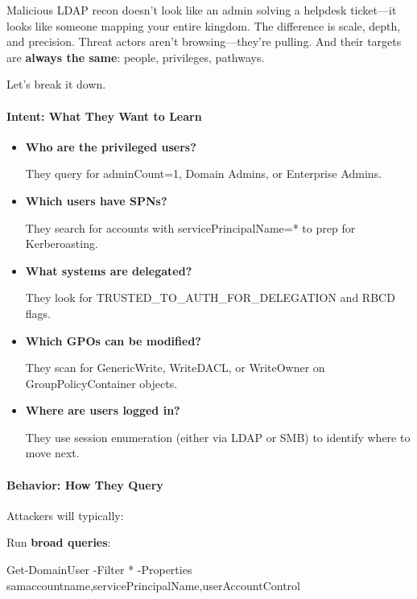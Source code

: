 {{Malicious LDAP recon doesn’t look like an admin solving a helpdesk ticket—it looks like someone mapping your entire kingdom. The difference is scale, depth, and precision. Threat actors aren’t browsing—they’re pulling. And their targets are \textbf{always the same}: people, privileges, pathways.

Let’s break it down.

\paragraph{\textbf{   Intent: What They Want to Learn}}

\begin{itemize}
    \item \textbf{Who are the privileged users?}

 They query for adminCount=1, Domain Admins, or Enterprise Admins.

    \item \textbf{Which users have SPNs?}

 They search for accounts with servicePrincipalName=* to prep for Kerberoasting.

    \item \textbf{What systems are delegated?}

 They look for TRUSTED\_TO\_AUTH\_FOR\_DELEGATION and RBCD flags.

    \item \textbf{Which GPOs can be modified?}

 They scan for GenericWrite, WriteDACL, or WriteOwner on GroupPolicyContainer objects.

    \item \textbf{Where are users logged in?}

 They use session enumeration (either via LDAP or SMB) to identify where to move next.

\end{itemize}

\paragraph{\textbf{   Behavior: How They Query}}

Attackers will typically:

Run \textbf{broad queries}:

  

 

Get-DomainUser -Filter * -Properties samaccountname,servicePrincipalName,userAccountControl

}}

